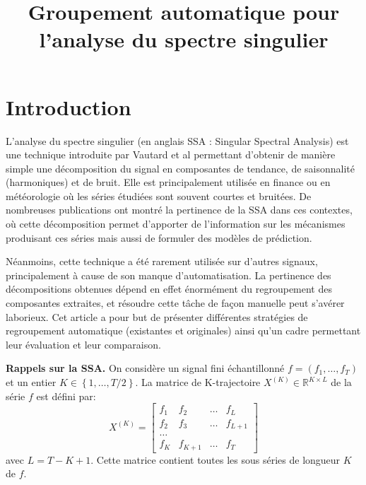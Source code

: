 \documentclass{gretsi}
\title{Groupement automatique pour l'analyse du spectre singulier}
\affil{2}{COGNAC-G - Université Paris Descartes} %
\affil{3}{L2TI - Université Paris 13 - 99 Avenue Jean Baptiste Clément, 93430 Villetaneuse}}
\newcommand{\R}{\mathbb R}
\newcommand{\val}[3]{(#1_1 #3 \dots #3 #1_#2)}
\begin{document}
\maketitle


\section{Introduction}
\label{sec:intro}

L'analyse du spectre singulier (en anglais SSA : Singular Spectral Analysis) est une technique introduite par Vautard et al \cite{vautard_89_SSA} permettant d'obtenir de manière simple une décomposition du signal en composantes de tendance, de saisonnalité (harmoniques) et de bruit.
Elle est principalement utilisée en finance ou en météorologie où les séries étudiées sont souvent courtes et bruitées.
De nombreuses publications ont montré la pertinence de la SSA dans ces contextes, où cette décomposition permet d'apporter de l'information sur les mécanismes produisant ces séries mais aussi de formuler des modèles de prédiction.


Néanmoins, cette technique a été rarement utilisée sur d'autres signaux, principalement à cause de son manque d'automatisation.
La pertinence des décompositions obtenues dépend en effet énormément du regroupement des composantes extraites, et résoudre cette tâche de façon manuelle peut s'avérer laborieux.
Cet article a pour but de présenter différentes stratégies de regroupement automatique (existantes et originales) ainsi qu'un cadre permettant leur évaluation et leur comparaison.



\textbf{Rappels sur la SSA.}\label{sub:rap}
On considère un signal fini échantillonné $f = \val{f}{T}{,}$ et un entier $K \in \left \{ 1, \dots, T/2 \right \}$.
La matrice de K-trajectoire $X^{(K)} \in \R^{K\times L}$ de la série $f$ est défini par:
\begin{equation} 
    X^{(K)} =
    \begin{bmatrix}
	    f_1 & f_2 &\dots & f_L\\
	    f_2 & f_3 &\dots & f_{L+1}\\
	    \dots\\
	    f_{K} & f_{K+1} &\dots & f_T
    \end{bmatrix}
\end{equation}
avec $L = T-K+1$.
Cette matrice contient toutes les sous séries de longueur $K$ de $f$.
\end{document}
